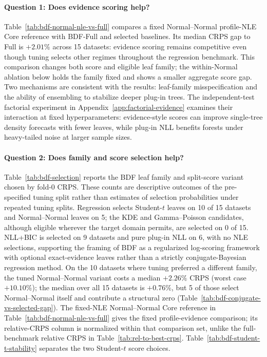 \paragraph{Question 1: Does evidence scoring help?}
Table~\ref{tab:bdf-normal-nle-vs-full} compares a fixed Normal--Normal profile-NLE Core reference with BDF-Full and selected baselines. Its median CRPS gap to Full is $+2.01\%$ across 15 datasets: evidence scoring remains competitive even though tuning selects other regimes throughout the regression benchmark. This comparison changes both score and eligible leaf family; the within-Normal ablation below holds the family fixed and shows a smaller aggregate score gap. Two mechanisms are consistent with the results: leaf-family misspecification and the ability of ensembling to stabilize deeper plug-in trees. The independent-test factorial experiment in Appendix~\ref{app:factorial-evidence} examines their interaction at fixed hyperparameters: evidence-style scores can improve single-tree density forecasts with fewer leaves, while plug-in NLL benefits forests under heavy-tailed noise at larger sample sizes.



\paragraph{Question 2: Does family and score selection help?}
Table~\ref{tab:bdf-selection} reports the BDF leaf family and split-score variant chosen by fold-0 CRPS. These counts are descriptive outcomes of the pre-specified tuning split rather than estimates of selection probabilities under repeated tuning splits. Regression selects Student-$t$ leaves on 10 of 15 datasets and Normal--Normal leaves on 5; the KDE and Gamma--Poisson candidates, although eligible wherever the target domain permits, are selected on 0 of 15. NLL+BIC is selected on 9 datasets and pure plug-in NLL on 6, with no NLE selections, supporting the framing of BDF as a regularized log-scoring framework with optional exact-evidence leaves rather than a strictly conjugate-Bayesian regression method. On the 10 datasets where tuning preferred a different family, the tuned Normal--Normal variant costs a median $+2.26\%$ CRPS (worst case $+10.10\%$); the median over all 15 datasets is $+0.76\%$, but 5 of those select Normal--Normal itself and contribute a structural zero (Table~\ref{tab:bdf-conjugate-vs-selected-gap}). The fixed-NLE Normal--Normal Core reference in Table~\ref{tab:bdf-normal-nle-vs-full} gives the fixed profile-evidence comparison; its relative-CRPS column is normalized within that comparison set, unlike the full-benchmark relative CRPS in Table~\ref{tab:rel-to-best-crps}. Table~\ref{tab:bdf-student-t-stability} separates the two Student-$t$ score choices.

